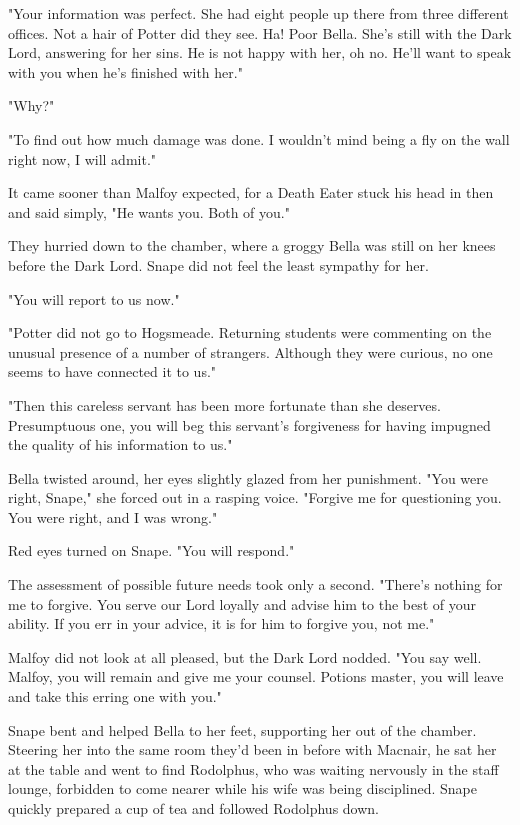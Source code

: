 "Your information was perfect. She had eight people up there from three different offices. Not a hair of Potter did they see. Ha! Poor Bella. She's still with the Dark Lord, answering for her sins. He is not happy with her, oh no. He'll want to speak with you when he's finished with her."

"Why?"

"To find out how much damage was done. I wouldn't mind being a fly on the wall right now, I will admit."

It came sooner than Malfoy expected, for a Death Eater stuck his head in then and said simply, "He wants you. Both of you."

They hurried down to the chamber, where a groggy Bella was still on her knees before the Dark Lord. Snape did not feel the least sympathy for her.

"You will report to us now."

"Potter did not go to Hogsmeade. Returning students were commenting on the unusual presence of a number of strangers. Although they were curious, no one seems to have connected it to us."

"Then this careless servant has been more fortunate than she deserves. Presumptuous one, you will beg this servant's forgiveness for having impugned the quality of his information to us."

Bella twisted around, her eyes slightly glazed from her punishment. "You were right, Snape," she forced out in a rasping voice. "Forgive me for questioning you. You were right, and I was wrong."

Red eyes turned on Snape. "You will respond."

The assessment of possible future needs took only a second. "There's nothing for me to forgive. You serve our Lord loyally and advise him to the best of your ability. If you err in your advice, it is for him to forgive you, not me."

Malfoy did not look at all pleased, but the Dark Lord nodded. "You say well. Malfoy, you will remain and give me your counsel. Potions master, you will leave and take this erring one with you."

Snape bent and helped Bella to her feet, supporting her out of the chamber. Steering her into the same room they'd been in before with Macnair, he sat her at the table and went to find Rodolphus, who was waiting nervously in the staff lounge, forbidden to come nearer while his wife was being disciplined. Snape quickly prepared a cup of tea and followed Rodolphus down.


